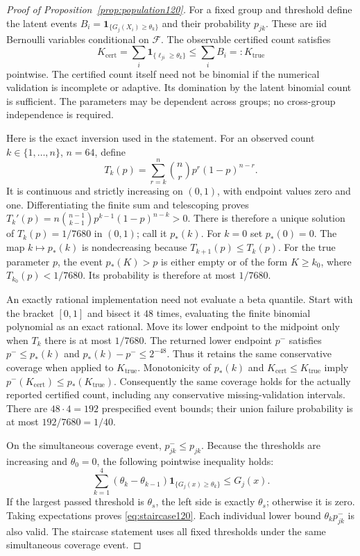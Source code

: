 \begin{proof}[Proof of Proposition~\ref{prop:population120}]
For a fixed group and threshold define the latent events
$B_i=\boldsymbol1_{\{G_j(X_i)\ge\theta_k\}}$ and their
probability $p_{jk}$.
These are iid Bernoulli variables conditional on
$\mathcal F$.
The observable certified count satisfies
\[
 K_{\mathrm{cert}}
 =\sum_i\boldsymbol1_{\{\ell_{ji}\ge\theta_k\}}
 \le\sum_iB_i=:K_{\mathrm{true}}
\]
pointwise.  The certified count itself need not be
binomial if the numerical validation is incomplete
or adaptive.  Its domination by the latent binomial
count is sufficient.  The parameters may be dependent
across groups; no cross-group independence is required.

Here is the exact inversion used in the statement.
For an observed count $k\in\{1,\ldots,n\}$, $n=64$, define
\[
 T_k(p)=\sum_{r=k}^n {n\choose r}p^r(1-p)^{n-r}.
\]
It is continuous and strictly increasing on $(0,1)$, with
endpoint values zero and one.  Differentiating the finite
sum and telescoping proves
$T_k'(p)=n{n-1\choose k-1}p^{k-1}(1-p)^{n-k}>0$.
There is therefore a unique solution of
$T_k(p)=1/7680$ in $(0,1)$; call it $p_*(k)$.
For $k=0$ set $p_*(0)=0$.
The map $k\mapsto p_*(k)$ is nondecreasing because
$T_{k+1}(p)\le T_k(p)$.
For the true parameter $p$, the event
$p_*(K)>p$ is either empty or of the form $K\ge k_0$,
where $T_{k_0}(p)<1/7680$.
Its probability is therefore at most $1/7680$.

An exactly rational implementation need not evaluate a
beta quantile.  Start with the bracket $[0,1]$ and
bisect it $48$ times, evaluating the finite binomial
polynomial as an exact rational.  Move its lower endpoint
to the midpoint only when $T_k$ there is at most $1/7680$.
The returned lower endpoint $p^-$ satisfies
$p^-\le p_*(k)$ and $p_*(k)-p^-\le2^{-48}$.
Thus it retains the same conservative coverage when
applied to $K_{\mathrm{true}}$.
Monotonicity of $p_*(k)$ and
$K_{\mathrm{cert}}\le K_{\mathrm{true}}$ imply
$p^-(K_{\mathrm{cert}})\le p_*(K_{\mathrm{true}})$.
Consequently the same coverage holds for the actually
reported certified count, including any conservative
missing-validation intervals.
There are $48\cdot4=192$ prespecified event bounds;
their union failure probability is at most
$192/7680=1/40$.

On the simultaneous coverage event, $p^-_{jk}\le p_{jk}$.
Because the thresholds are increasing and $\theta_0=0$,
the following pointwise inequality holds:
\[
 \sum_{k=1}^4(\theta_k-\theta_{k-1})
          \boldsymbol1_{\{G_j(x)\ge\theta_k\}}
 \le G_j(x).
\]
If the largest passed threshold is $\theta_s$, the
left side is exactly $\theta_s$; otherwise it is zero.
Taking expectations proves \eqref{eq:staircase120}.
Each individual lower bound $\theta_kp^-_{jk}$
is also valid.  The staircase statement uses all fixed
thresholds under the same simultaneous coverage event.


\end{proof}
